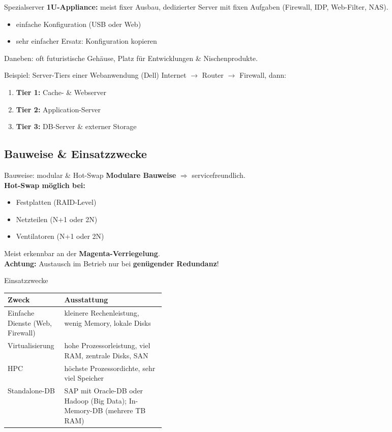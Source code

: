\documentclass[a4paper, fontsize=7pt]{scrartcl}
\renewcommand*{\arraystretch}{1.5}  %
\begin{document}
\begin{mainbox}{Spezialserver}
\textbf{1U-Appliance:} meist fixer Ausbau, dedizierter Server mit fixen Aufgaben
(Firewall, IDP, Web-Filter, NAS).
\begin{itemize}
    \item einfache Konfiguration (USB oder Web)
    \item sehr einfacher Ersatz: Konfiguration kopieren
\end{itemize}
Daneben: oft futuristische Gehäuse, Platz für Entwicklungen \& Nischenprodukte.
\end{mainbox}

\begin{subbox}{Beispiel: Server-Tiers einer Webanwendung (Dell)}
Internet $\to$ Router $\to$ Firewall, dann:
\begin{enumerate}
    \item \textbf{Tier 1:} Cache- \& Webserver
    \item \textbf{Tier 2:} Application-Server
    \item \textbf{Tier 3:} DB-Server \& externer Storage
\end{enumerate}
\end{subbox}

\subsection{Bauweise \& Einsatzzwecke}

\begin{mainbox}{Bauweise: modular \& Hot-Swap}
\textbf{Modulare Bauweise} $\Rightarrow$ servicefreundlich.\\
\textbf{Hot-Swap möglich bei:}
\begin{itemize}
    \item Festplatten (RAID-Level)
    \item Netzteilen (N+1 oder 2N)
    \item Ventilatoren (N+1 oder 2N)
\end{itemize}
Meist erkennbar an der \textbf{Magenta-Verriegelung}.\\
\textbf{Achtung:} Austausch im Betrieb nur bei \textbf{genügender Redundanz}!
\end{mainbox}

\begin{mainbox}{Einsatzzwecke}
\renewcommand*{\arraystretch}{1.15}
\begin{tabularx}{\linewidth}{@{}>{\raggedright\arraybackslash}p{0.36\linewidth}|>{\raggedright\arraybackslash}X@{}}
\textbf{Zweck} & \textbf{Ausstattung} \\
\hline
Einfache Dienste (Web, Firewall) & kleinere Rechenleistung, wenig Memory, lokale
  Disks \\
Virtualisierung & hohe Prozessorleistung, viel RAM, zentrale Disks, SAN \\
HPC & höchste Prozessordichte, sehr viel Speicher \\
Standalone-DB & SAP mit Oracle-DB oder Hadoop (Big Data); In-Memory-DB (mehrere
  TB RAM) \\
\end{tabularx}
\end{mainbox}
\end{document}
